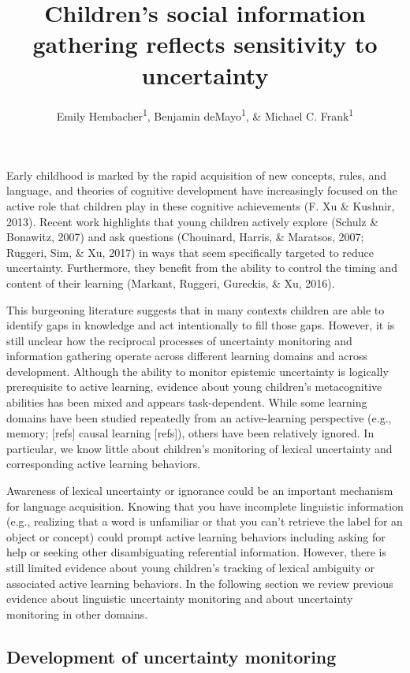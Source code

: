 \documentclass[english,man]{apa6}
\title{Children's social information gathering reflects sensitivity to
uncertainty}
\author{Emily Hembacher\textsuperscript{1}, Benjamin deMayo\textsuperscript{1}, \& Michael C. Frank\textsuperscript{1}}
\affiliation{
    \vspace{0.5cm}
          \textsuperscript{1} Stanford University  }
\theoremstyle{definition}
\theoremstyle{definition}
\theoremstyle{definition}
\theoremstyle{remark}
\begin{document}
\maketitle

\setcounter{secnumdepth}{0}



Early childhood is marked by the rapid acquisition of new concepts,
rules, and language, and theories of cognitive development have
increasingly focused on the active role that children play in these
cognitive achievements (F. Xu \& Kushnir, 2013). Recent work highlights
that young children actively explore (Schulz \& Bonawitz, 2007) and ask
questions (Chouinard, Harris, \& Maratsos, 2007; Ruggeri, Sim, \& Xu,
2017) in ways that seem specifically targeted to reduce uncertainty.
Furthermore, they benefit from the ability to control the timing and
content of their learning (Markant, Ruggeri, Gureckis, \& Xu, 2016).

This burgeoning literature suggests that in many contexts children are
able to identify gaps in knowledge and act intentionally to fill those
gaps. However, it is still unclear how the reciprocal processes of
uncertainty monitoring and information gathering operate across
different learning domains and across development. Although the ability
to monitor epistemic uncertainty is logically prerequisite to active
learning, evidence about young children's metacognitive abilities has
been mixed and appears task-dependent. While some learning domains have
been studied repeatedly from an active-learning perspective (e.g.,
memory; {[}refs{]} causal learning {[}refs{]}), others have been
relatively ignored. In particular, we know little about children's
monitoring of lexical uncertainty and corresponding active learning
behaviors.

Awareness of lexical uncertainty or ignorance could be an important
mechanism for language acquisition. Knowing that you have incomplete
linguistic information (e.g., realizing that a word is unfamiliar or
that you can't retrieve the label for an object or concept) could prompt
active learning behaviors including asking for help or seeking other
disambiguating referential information. However, there is still limited
evidence about young children's tracking of lexical ambiguity or
associated active learning behaviors. In the following section we review
previous evidence about linguistic uncertainty monitoring and about
uncertainty monitoring in other domains.

\subsection{Development of uncertainty
monitoring}\label{development-of-uncertainty-monitoring}
\end{document}
